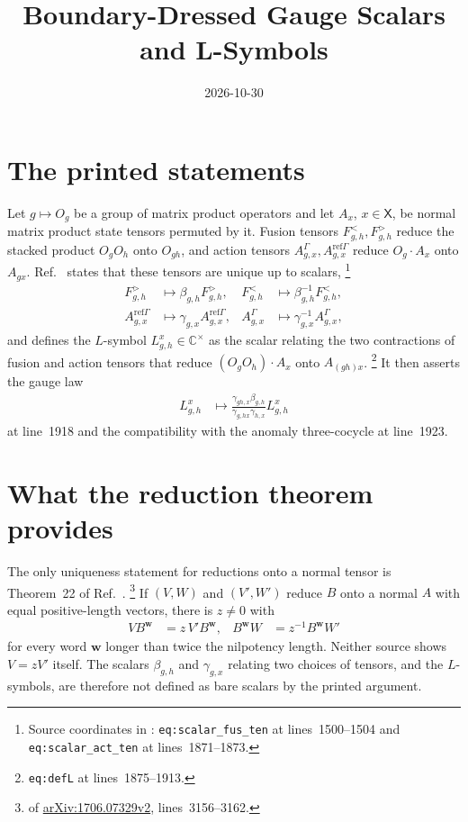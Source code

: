 \documentclass{article}
\title{Boundary-Dressed Gauge Scalars and L-Symbols}
\author{}
\date{2026-10-30}
\begin{document}
\maketitle
{}

\section{The printed statements}

Let $g\mapsto O_g$ be a group of matrix product operators and let $A_x$,
$x\in\mathsf X$, be normal matrix product state tensors permuted by it.
Fusion tensors $F^<_{g,h},F^>_{g,h}$ reduce the stacked product $O_gO_h$ onto
$O_{gh}$, and action tensors $A^\Gamma_{g,x},A^{\text{ref}\Gamma}_{g,x}$
reduce $O_g\cdot A_x$ onto $A_{gx}$.  Ref.~\cite{FrancoRubio2025MPUGauging}
states that these tensors are unique up to scalars,
\footnote{Source coordinates in :
    \texttt{eq:scalar\_fus\_ten} at lines~1500--1504 and
    \texttt{eq:scalar\_act\_ten} at lines~1871--1873.}
\begin{align}
    F^>_{g,h}
        &\mapsto\beta_{g,h}F^>_{g,h},
    &F^<_{g,h}
        &\mapsto\beta_{g,h}^{-1}F^<_{g,h},
    \label{eq:fbc25_dressed_fusion_gauge}\\
    A^{\text{ref}\Gamma}_{g,x}
        &\mapsto\gamma_{g,x}A^{\text{ref}\Gamma}_{g,x},
    &A^{\Gamma}_{g,x}
        &\mapsto\gamma_{g,x}^{-1}A^{\Gamma}_{g,x},
    \label{eq:fbc25_dressed_action_gauge}
\end{align}
and defines the $L$-symbol $L^x_{g,h}\in\mathbb C^\times$ as the scalar
relating the two contractions of fusion and action tensors that reduce
$(O_gO_h)\cdot A_x$ onto $A_{(gh)x}$.
\footnote{\texttt{eq:defL} at lines~1875--1913.}
It then asserts the gauge law
\begin{align}
    L^x_{g,h}
        &\mapsto\frac{\gamma_{gh,x}\beta_{g,h}}{\gamma_{g,hx}\gamma_{h,x}}
          L^x_{g,h}
    \label{eq:fbc25_dressed_l_gauge}
\end{align}
at line~1918 and the compatibility with the anomaly three-cocycle at
line~1923.

\section{What the reduction theorem provides}

The only uniqueness statement for reductions onto a normal tensor is
Theorem~22 of Ref.~\cite{Molnar2018SemiInjective}.
\footnote{ of
    \href{https://arxiv.org/abs/1706.07329v2}{arXiv:1706.07329v2},
    lines~3156--3162.}
If $(V,W)$ and $(V',W')$ reduce $B$ onto a normal $A$ with equal
positive-length vectors, there is $z\ne0$ with
\begin{align}
    VB^{\mathbf w}
        &=z\,V'B^{\mathbf w},
    &B^{\mathbf w}W
        &=z^{-1}B^{\mathbf w}W'
    \label{eq:fbc25_dressed_comparison}
\end{align}
for every word $\mathbf w$ longer than twice the nilpotency length.  Neither
source shows $V=zV'$ itself.  The scalars $\beta_{g,h}$ and $\gamma_{g,x}$
relating two choices of tensors, and the $L$-symbols, are therefore not
defined as bare scalars by the printed argument.
\end{document}

